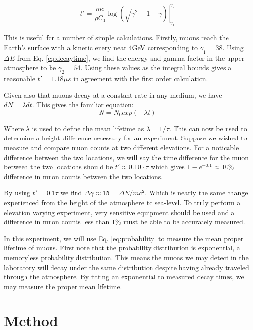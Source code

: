 \documentclass[12pt,twocolumn]{article}
\begin{document}
\begin{equation}
	t' = \frac{mc}{\rho C_{0}} \left.\log\left(\sqrt{\gamma^{2}-1}+\gamma\right)\right|_{\gamma_{1}}^{\gamma_{2}}
\end{equation}

This is useful for a number of simple calculations. Firstly, muons reach the Earth's surface with a kinetic enery near 4GeV
 corresponding to $\gamma_{1}=38$. Using $\Delta E$ from Eq. \ref{eq:decaytime}, we find the energy and gamma factor in the
 upper atmosphere to be $\gamma_{2}=54.$ Using these values as the integral bounds gives a reasonable $t'=1.18\mu s$ in agreement with
 the first order calculation.

 Given also that muons decay at a constant rate in any medium, we have $dN=\lambda dt$. This gives the familiar
 equation:
 \begin{equation}
	 \label{eq:probability}
	 N=N_{0}exp(-\lambda t)
 \end{equation}
 
 Where $\lambda$ is used to define the mean lifetime as $\lambda=1/\tau$.  This can 
 now be used to determine a height difference necessary for an experiment. Suppose we wished to measure and
 compare muon counts at two different elevations. For a noticable difference between the two locations, we will say
 the time difference for the muon between the two locations should be $t'\approx 0.10\cdot\tau$ which gives $1-e^{-0.1}\approx10\%$
difference in muon counts between the two locations.

By using $t'=0.1\tau$ we find $\Delta\gamma\approx15=\Delta E / mc^2$. Which is nearly the same change experienced from
the height of the atmosphere to sea-level. To truly perform a elevation varying experiment, very sensitive equipment should
be used and a difference in muon counts less than 1\% must be able to be accurately measured.

In this experiment, we will use Eq. \ref{eq:probability} to measure the mean proper lifetime of muons. First note that
the probability distribution is exponential, a memoryless probability distribution. This means the muons we may detect
in the laboratory will decay under the same distribution despite having already traveled through the atmosphere. By
fitting an exponential to measured decay times, we may measure the proper mean lifetime.

\section{Method}
\end{document}
